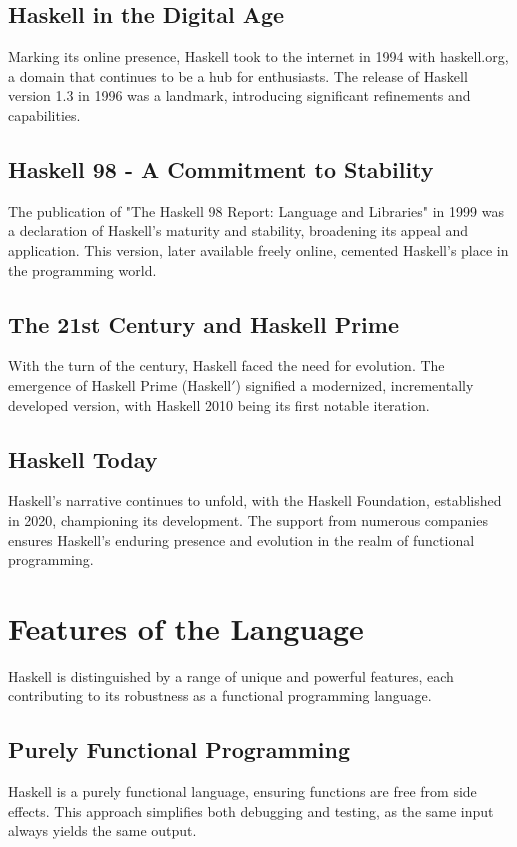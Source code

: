 \documentclass[a4paper, 10pt]{article}
\begin{document}
        \subsection{Haskell in the Digital Age}
            Marking its online presence, Haskell took to the internet in 1994 with haskell.org, a domain that continues to be a hub for enthusiasts. The release of Haskell version 1.3 in 1996 was a landmark, introducing significant refinements and capabilities.

        \subsection{Haskell 98 - A Commitment to Stability}
            The publication of "The Haskell 98 Report: Language and Libraries" in 1999 was a declaration of Haskell's maturity and stability, broadening its appeal and application. This version, later available freely online, cemented Haskell's place in the programming world.

        \subsection{The 21st Century and Haskell Prime}
            With the turn of the century, Haskell faced the need for evolution. The emergence of Haskell Prime (Haskell$'$) signified a modernized, incrementally developed version, with Haskell 2010 being its first notable iteration.

        \subsection{Haskell Today}
            Haskell's narrative continues to unfold, with the Haskell Foundation, established in 2020, championing its development. The support from numerous companies ensures Haskell's enduring presence and evolution in the realm of functional programming.

    \pagebreak
	\section{Features of the Language}
        Haskell is distinguished by a range of unique and powerful features, each contributing to its robustness as a functional programming language.

        \subsection{Purely Functional Programming}
            Haskell is a purely functional language, ensuring functions are free from side effects. This approach simplifies both debugging and testing, as the same input always yields the same output.
\end{document}

